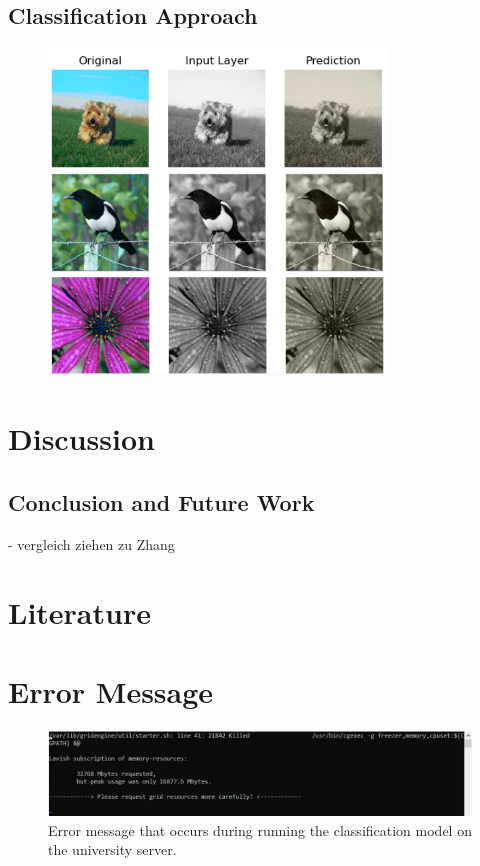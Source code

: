 \documentclass[12pt,letterpaper]{article}
\begin{document}
\subsection{Classification Approach}
\begin{figure}
	\centering
	\includegraphics[width=0.8\textwidth]{classific_predict.png}
	\caption{}
	\label{class}
\end{figure}

\section{Discussion}

\subsection{Conclusion and Future Work}
- vergleich ziehen zu Zhang\\
\newpage
\thispagestyle{empty}
\section{Literature}
\label{Lit}

\renewcommand{\bibsection}{}



\newpage
\appendix
{}
\section{Error Message}
\begin{figure}[ht]
	\centering
	\includegraphics[width=1.0\textwidth]{error.png}
	\caption{Error message that occurs during running the classification model on the university server.}
	\label{error}
\end{figure}

	
\end{document}
